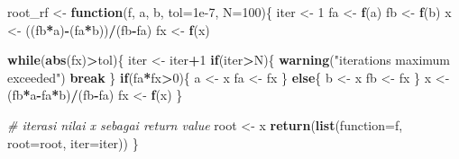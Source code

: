 \documentclass[
]{book}
\newenvironment{Shaded}{\begin{snugshade}}{\end{snugshade}}
\newcommand{\AttributeTok}[1]{\textcolor[rgb]{0.13,0.29,0.53}{#1}}
\newcommand{\CommentTok}[1]{\textcolor[rgb]{0.56,0.35,0.01}{\textit{#1}}}
\newcommand{\ControlFlowTok}[1]{\textcolor[rgb]{0.13,0.29,0.53}{\textbf{#1}}}
\newcommand{\DecValTok}[1]{\textcolor[rgb]{0.00,0.00,0.81}{#1}}
\newcommand{\FloatTok}[1]{\textcolor[rgb]{0.00,0.00,0.81}{#1}}
\newcommand{\FunctionTok}[1]{\textcolor[rgb]{0.13,0.29,0.53}{\textbf{#1}}}
\newcommand{\NormalTok}[1]{#1}
\newcommand{\OtherTok}[1]{\textcolor[rgb]{0.56,0.35,0.01}{#1}}
\newcommand{\SpecialCharTok}[1]{\textcolor[rgb]{0.81,0.36,0.00}{\textbf{#1}}}
\newcommand{\StringTok}[1]{\textcolor[rgb]{0.31,0.60,0.02}{#1}}
\theoremstyle{definition}
\theoremstyle{definition}
\theoremstyle{definition}
\theoremstyle{definition}
\theoremstyle{remark}
\begin{document}
\begin{Shaded}
\begin{Highlighting}[]
\NormalTok{root\_rf }\OtherTok{\textless{}{-}} \ControlFlowTok{function}\NormalTok{(f, a, b, }\AttributeTok{tol=}\FloatTok{1e{-}7}\NormalTok{, }\AttributeTok{N=}\DecValTok{100}\NormalTok{)\{}
\NormalTok{  iter }\OtherTok{\textless{}{-}} \DecValTok{1}
\NormalTok{  fa }\OtherTok{\textless{}{-}} \FunctionTok{f}\NormalTok{(a)}
\NormalTok{  fb }\OtherTok{\textless{}{-}} \FunctionTok{f}\NormalTok{(b)}
\NormalTok{  x }\OtherTok{\textless{}{-}}\NormalTok{ ((fb}\SpecialCharTok{*}\NormalTok{a)}\SpecialCharTok{{-}}\NormalTok{(fa}\SpecialCharTok{*}\NormalTok{b))}\SpecialCharTok{/}\NormalTok{(fb}\SpecialCharTok{{-}}\NormalTok{fa)}
\NormalTok{  fx }\OtherTok{\textless{}{-}} \FunctionTok{f}\NormalTok{(x)}
  
  \ControlFlowTok{while}\NormalTok{(}\FunctionTok{abs}\NormalTok{(fx)}\SpecialCharTok{\textgreater{}}\NormalTok{tol)\{}
\NormalTok{    iter }\OtherTok{\textless{}{-}}\NormalTok{ iter}\SpecialCharTok{+}\DecValTok{1}
    \ControlFlowTok{if}\NormalTok{(iter}\SpecialCharTok{\textgreater{}}\NormalTok{N)\{}
      \FunctionTok{warning}\NormalTok{(}\StringTok{"iterations maximum exceeded"}\NormalTok{)}
      \ControlFlowTok{break}
\NormalTok{    \}}
    \ControlFlowTok{if}\NormalTok{(fa}\SpecialCharTok{*}\NormalTok{fx}\SpecialCharTok{\textgreater{}}\DecValTok{0}\NormalTok{)\{}
\NormalTok{      a }\OtherTok{\textless{}{-}}\NormalTok{ x}
\NormalTok{      fa }\OtherTok{\textless{}{-}}\NormalTok{ fx}
\NormalTok{    \} }\ControlFlowTok{else}\NormalTok{\{}
\NormalTok{      b }\OtherTok{\textless{}{-}}\NormalTok{ x}
\NormalTok{      fb }\OtherTok{\textless{}{-}}\NormalTok{ fx}
\NormalTok{    \}}
\NormalTok{    x }\OtherTok{\textless{}{-}}\NormalTok{ (fb}\SpecialCharTok{*}\NormalTok{a}\SpecialCharTok{{-}}\NormalTok{fa}\SpecialCharTok{*}\NormalTok{b)}\SpecialCharTok{/}\NormalTok{(fb}\SpecialCharTok{{-}}\NormalTok{fa)}
\NormalTok{    fx }\OtherTok{\textless{}{-}} \FunctionTok{f}\NormalTok{(x)}
\NormalTok{  \}}
  
  \CommentTok{\# iterasi nilai x sebagai return value}
\NormalTok{  root }\OtherTok{\textless{}{-}}\NormalTok{ x}
  \FunctionTok{return}\NormalTok{(}\FunctionTok{list}\NormalTok{(}\StringTok{\textasciigrave{}}\AttributeTok{function}\StringTok{\textasciigrave{}}\OtherTok{=}\NormalTok{f, }\AttributeTok{root=}\NormalTok{root, }\AttributeTok{iter=}\NormalTok{iter))}
\NormalTok{\}}
\end{Highlighting}
\end{Shaded}
\end{document}
